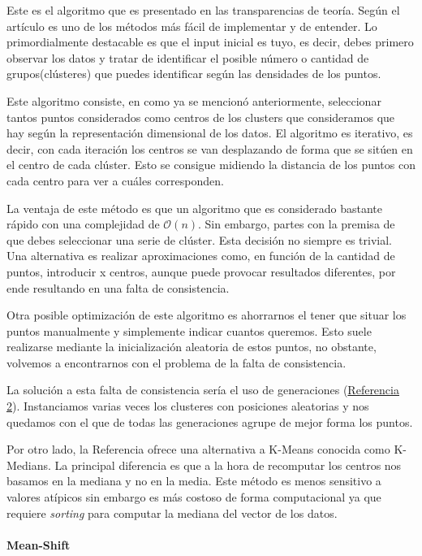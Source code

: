 \documentclass[conference,a4paper]{IEEEtran}
\begin{document}
Este es el algoritmo que es presentado en las transparencias de teoría. Según el artículo es uno de los métodos más fácil de implementar y de entender. Lo primordialmente destacable es que el input inicial es tuyo, es decir, debes primero observar los datos y tratar de identificar el posible número o cantidad de grupos(clústeres) que puedes identificar según las densidades de los puntos.

Este algoritmo consiste, en como ya se mencionó anteriormente, seleccionar tantos puntos considerados como centros de los clusters que consideramos que hay según la representación dimensional de los datos. El algoritmo es iterativo, es decir, con cada iteración los centros se van desplazando de forma que se sitúen en el centro de cada clúster. Esto se consigue midiendo la distancia de los puntos con cada centro para ver a cuáles corresponden.

La ventaja de este método es que un algoritmo que es considerado bastante rápido con una complejidad de $\mathcal{O}(n)$. Sin embargo, partes con la premisa de que debes seleccionar una serie de clúster. Esta decisión no siempre es trivial. Una alternativa es realizar aproximaciones como, en función de la cantidad de puntos, introducir x centros, aunque puede provocar resultados diferentes, por ende resultando en una falta de consistencia.

Otra posible optimización de este algoritmo es ahorrarnos el tener que situar los puntos manualmente y simplemente indicar cuantos queremos. Esto suele realizarse mediante la inicialización aleatoria de estos puntos, no obstante, volvemos a encontrarnos con el problema de la falta de consistencia.

La solución a esta falta de consistencia sería el uso de generaciones (\hyperref[bib:clustering]{Referencia 2}). Instanciamos varias veces los clusteres con posiciones aleatorias y nos quedamos con el que de todas las generaciones agrupe de mejor forma los puntos.

Por otro lado, la Referencia ofrece una alternativa a K-Means conocida como K-Medians. La principal diferencia es que a la hora de recomputar los centros nos basamos en la mediana y no en la media. Este método es menos sensitivo a valores atípicos sin embargo es más costoso de forma computacional ya que requiere \textit{sorting} para computar la mediana del vector de los datos.

\paragraph{\textbf{Mean-Shift}}
\end{document}
